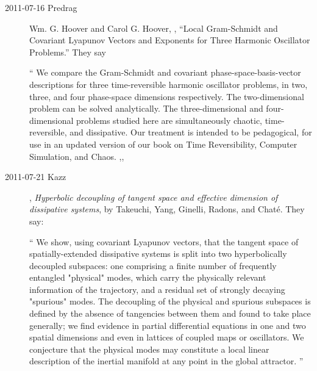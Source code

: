 \begin{description}
\item[2011-07-16 Predrag]
Wm. G. Hoover and Carol G. Hoover, ,
``Local Gram-Schmidt and Covariant Lyapunov Vectors and Exponents for
 Three Harmonic Oscillator Problems.'' They say

``
We compare the Gram-Schmidt and covariant phase-space-basis-vector
descriptions for three time-reversible harmonic oscillator problems, in two,
three, and four phase-space dimensions respectively. The two-dimensional
problem can be solved analytically. The three-dimensional and four-dimensional
problems studied here are simultaneously chaotic, time-reversible, and
dissipative. Our treatment is intended to be pedagogical, for use in an updated
version of our book on Time Reversibility, Computer Simulation, and Chaos.
,,

\item[2011-07-21 Kazz] ,
\emph{Hyperbolic decoupling of tangent space
      and effective dimension of dissipative systems},
by Takeuchi, Yang, Ginelli, Radons, and Chat\'e.
They say:

``
We show, using covariant Lyapunov vectors, that the tangent space of
spatially-extended dissipative systems is split into two hyperbolically
decoupled subspaces: one comprising a finite number of frequently
entangled "physical" modes, which carry the physically relevant
information of the trajectory, and a residual set of strongly decaying
"spurious" modes. The decoupling of the physical and spurious subspaces
is defined by the absence of tangencies between them and found to take
place generally; we find evidence in partial differential equations in
one and two spatial dimensions and even in lattices of coupled maps or
oscillators. We conjecture that the physical modes may constitute a local
linear description of the inertial manifold at any point in the global
attractor.
''


\end{description}

\renewcommand{\ssp}{a}
